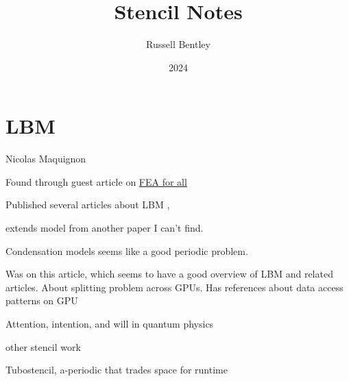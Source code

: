 \documentclass{beamer}
\title{Stencil Notes}
\author{Russell Bentley}
\institute{Stony Brook}
\date{2024}
\begin{document}
\frame{\titlepage}

\section{LBM}
\begin{frame}{Nicolas Maquignon}
  \begin{outline}
    \1 Found through guest article on 
    \href{https://feaforall.com/implementation-lattice-boltzmann-method-lbm/}{FEA for all}

    \1 Published several articles about LBM \cite{Maquignon2014}, \cite{Maquignon2022}

    \2 \cite{Maquignon2014} extends model from another paper I can't find.
      
    \2 Condensation models seems like a good periodic problem.

    \1 Was on this article, which seems to have a good overview of LBM and related articles. 
    About splitting problem across GPUs.
    Has references about data access patterns on GPU
    \cite{Duchateau2015}
  \end{outline}
\end{frame}

\begin{frame}
  \begin{outline}
    \1 Attention, intention, and will in quantum physics \cite{Stapp1999}
  \end{outline}
\end{frame}

\begin{frame}{other stencil work}
  \begin{outline}
    \1 Tubostencil, a-periodic that trades space for runtime \cite{Liu2023turbo}
  \end{outline}
\end{frame}
\end{document}

